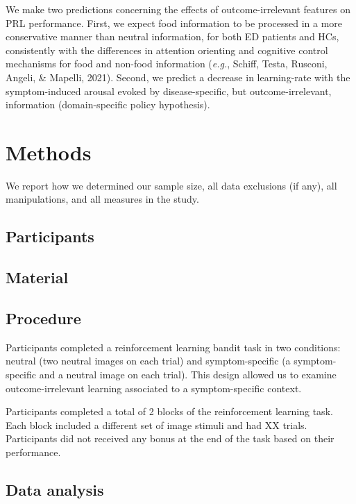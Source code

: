 \documentclass[
  man,floatsintext]{apa6}
\begin{document}
We make two predictions concerning the effects of outcome-irrelevant features on PRL performance. First, we expect food information to be processed in a more conservative manner than neutral information, for both ED patients and HCs, consistently with the differences in attention orienting and cognitive control mechanisms for food and non-food information (\emph{e.g.}, Schiff, Testa, Rusconi, Angeli, \& Mapelli, 2021). Second, we predict a decrease in learning-rate with the symptom-induced arousal evoked by disease-specific, but outcome-irrelevant, information (domain-specific policy hypothesis).

\hypertarget{methods}{%
\section{Methods}\label{methods}}

We report how we determined our sample size, all data exclusions (if any), all manipulations, and all measures in the study.

\hypertarget{participants}{%
\subsection{Participants}\label{participants}}

\hypertarget{material}{%
\subsection{Material}\label{material}}

\hypertarget{procedure}{%
\subsection{Procedure}\label{procedure}}

Participants completed a reinforcement learning bandit task in two conditions: neutral (two neutral images on each trial) and symptom-specific (a symptom-specific and a neutral image on each trial). This design allowed us to examine outcome-irrelevant learning associated to a symptom-specific context.

Participants completed a total of 2 blocks of the reinforcement learning task. Each block included a different set of image stimuli and had XX trials. Participants did not received any bonus at the end of the task based on their performance.

\hypertarget{data-analysis}{%
\subsection{Data analysis}\label{data-analysis}}
\end{document}
